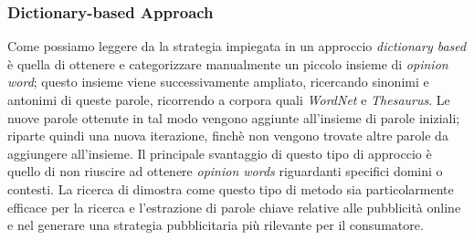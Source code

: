 \documentclass[a4paper,12pt,openright,twoside]{report}
\theoremstyle{definition}
\begin{document}
\subsubsection{Dictionary-based Approach}
Come possiamo leggere da \cite{Kim2004}
la strategia impiegata in un approccio \emph{dictionary based} è quella di ottenere e categorizzare
manualmente un piccolo insieme di \emph{opinion word}; questo insieme
viene successivamente ampliato, ricercando sinonimi e antonimi di queste parole,
ricorrendo a corpora quali \emph{WordNet}
e \emph{Thesaurus}.
Le nuove parole ottenute in tal modo vengono aggiunte all'insieme di parole iniziali;
riparte quindi una nuova iterazione, finchè non 
vengono trovate altre parole da aggiungere all'insieme.
Il principale svantaggio di questo tipo di approccio è quello di non riuscire ad ottenere \emph{opinion words}
riguardanti specifici domini o contesti.
La ricerca di \cite{Qui2010}
dimostra come questo tipo di metodo sia particolarmente efficace per la ricerca e l'estrazione di parole
chiave relative alle pubblicità online e nel generare una strategia pubblicitaria più rilevante per il
consumatore.
\end{document}
